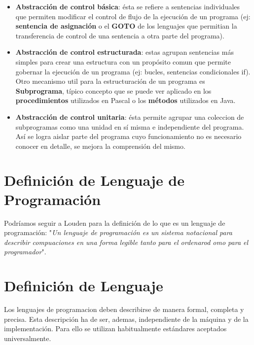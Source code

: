 \documentclass{article}
\begin{document}
\begin{itemize}
  \item \textbf{Abstracci\'on de control b\'asica}: \'esta se refiere a sentencias individuales que permiten modificar el control de flujo de la ejecuci\'on de un programa (ej: \textbf{sentencia de asignaci\'on} o el \textbf{GOTO} de los lenguajes que permitian la transferencia de control de una sentencia a otra parte del programa).
  \item \textbf{Abstracci\'on de control estructurada}: estas agrupan sentencias m\'as simples para crear una estructura con un prop\'osito comun que permite gobernar la ejecuci\'on de un programa (ej: bucles, sentencias condicionales if). Otro mecanismo util para la estructuraci\'on de un programa es \textbf{Subprograma}, t\'ipico concepto que se puede ver aplicado en los \textbf{procedimientos} utilizados en Pascal o los \textbf{m\'etodos} utilizados en Java.
  \item \textbf{Abstracci\'on de control unitaria}: \'esta permite agrupar una coleccion de subprogramas como una unidad en s\'i misma e independiente del programa. As\'i se logra aislar parte del programa cuyo funcionamiento no es necesario conocer en detalle, se mejora la comprensi\'on del mismo. 
\end{itemize}

\section{Definici\'on de Lenguaje de Programaci\'on}
Podr\'iamos seguir a Louden \cite{lengprog} para la definici\'on de lo que es un lenguaje de programaci\'on: "\textit{Un lenguaje de programaci\'on es un sistema notacional para describir compuaciones en una forma legible tanto para el ordenarod omo para el programador}".

\section{Definici\'on de Lenguaje}
Los lenguajes de programacion deben describirse de manera formal, completa y precisa. Esta descripción ha de ser, ademas, independiente de la máquina y de la implementaci\'on. Para ello se utilizan habitualmente est\'andares aceptados universalmente.
\end{document}
